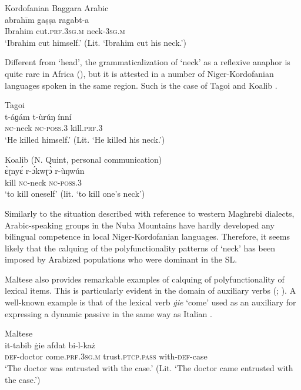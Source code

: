 \documentclass[output=paper]{langsci/langscibook}
\begin{document}
\ea\label{ex:key:20}
{Kordofanian Baggara Arabic \citep[176]{Manfredi2010}}\\
\gll  abrahīm gaṣṣa ragabt-a\\
       Ibrahim cut.\textsc{prf.3sg.m} neck-\textsc{3sg.m}\\
\glt   `Ibrahim cut himself.' (Lit. `Ibrahim cut his neck.')
\z

Different from ‘head’, the grammaticalization of ‘neck’ as a reflexive anaphor is quite rare in Africa (\citealt[50]{Heine2011}), but it is attested in a number of Niger-Kordofanian languages spoken in the same region. Such is the case of Tagoi  and Koalib . 

\ea\label{ex:key:21}
{Tagoi \citep[26]{Alamin2015}}\\
\gll   t-áɡám t-ùrúŋ ínní\\
       \textsc{nc}-neck \textsc{nc}-\textsc{poss.3} kill.\textsc{prf.3}\\
\glt   `He killed himself.' (Lit. ‘He killed his neck.’)
\z

\ea\label{ex:key:22}
{Koalib (N. Quint, personal communication)} \\
\gll   ɛ̀ɽnyɛ́ r-ɔ́kwɽɔ̀ r-ùŋwún\\
       kill \textsc{nc}-neck \textsc{nc-poss.3}\\
\glt   `to kill oneself' (lit. ‘to kill one's neck’)
\z

Similarly to the situation described with reference to western Maghrebi dialects, Arabic-speaking groups in the Nuba Mountains have hardly developed any bilingual competence in local Niger-Kordofanian languages. Therefore, it seems likely that the calquing of the polyfunctionality patterns of ‘neck’ has been imposed by Arabized populations who were dominant in the SL. 

Maltese also provides remarkable examples of calquing of polyfunctionality of lexical items. This is particularly evident in the domain of auxiliary verbs (\citealt{Vanhove1993}; \citealt{VanhoveCaubet2009}). A well-known example is that of the lexical verb \textit{\.gie} ‘come’ used as an auxiliary for expressing a dynamic passive  in the same way as Italian .

\ea\label{ex:key:23}
{Maltese \citep[214]{BorgAzzopardi-Alexander1997}}\\
\gll   it-tabib \.gie afdat bi-l-każ\\
       \textsc{def}-doctor come.\textsc{prf.3sg.m} trust.\textsc{ptcp.pass} with-\textsc{def}-case\\
\glt   `The doctor was entrusted with the case.' (Lit. ‘The doctor came entrusted with the case.’)
\z
\end{document}

